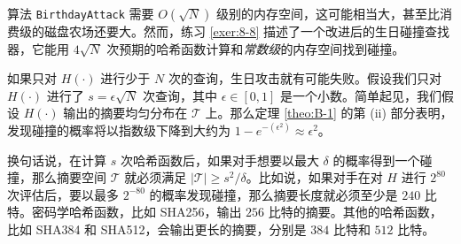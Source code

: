 \begin{snote}[变体。]
算法 \texttt{BirthdayAttack} 需要 $O(\sqrt{N})$ 级别的内存空间，这可能相当大，甚至比消费级的磁盘农场还要大。然而，练习 \ref{exer:8-8} 描述了一个改进后的生日碰撞查找器，它能用 $4\sqrt{N}$ 次预期的哈希函数计算和\emph{常数级}的内存空间找到碰撞。

如果只对 $H(\cdot)$ 进行少于 $N$ 次的查询，生日攻击就有可能失败。假设我们只对 $H(\cdot)$ 进行了 $s=\epsilon\sqrt{N}$ 次查询，其中 $\epsilon\in[0,1]$ 是一个小数。简单起见，我们假设 $H(\cdot)$ 输出的摘要均匀分布在 $\mathcal{T}$ 上。那么定理 \ref{theo:B-1} 的第 (ii) 部分表明，发现碰撞的概率将以指数级下降到大约为 $1-e^{-(\epsilon^2)}\approx\epsilon^2$。

换句话说，在计算 $s$ 次哈希函数后，如果对手想要以最大 $\delta$ 的概率得到一个碰撞，那么摘要空间 $\mathcal{T}$ 就必须满足 $|\mathcal{T}|\geq s^2/\delta$。比如说，如果对手在对 $H$ 进行 $2^80$ 次评估后，要以最多 $2^{-80}$ 的概率发现碰撞，那么摘要长度就必须至少是 $240$ 比特。密码学哈希函数，比如 SHA256，输出 $256$ 比特的摘要。其他的哈希函数，比如 SHA384 和 SHA512，会输出更长的摘要，分别是 $384$ 比特和 $512$ 比特。
\end{snote}